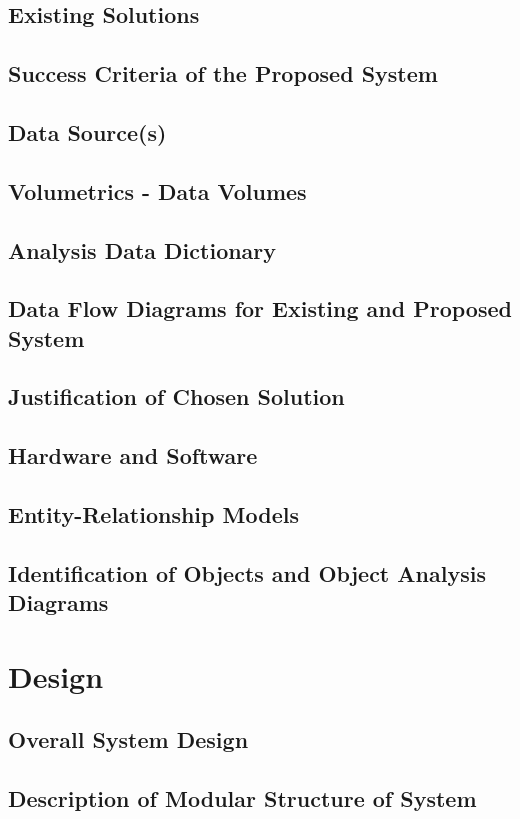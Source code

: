\documentclass[11pt]{article}
\begin{document}
        \subsection{Existing Solutions}
        \subsection{Success Criteria of the Proposed System}
        \subsection{Data Source(s)}
        \subsection{Volumetrics - Data Volumes}
        \subsection{Analysis Data Dictionary}
        \subsection{Data Flow Diagrams for Existing and Proposed System}
        \subsection{Justification of Chosen Solution}
        \subsection{Hardware and Software}
        \subsection{Entity-Relationship Models}
        \subsection{Identification of Objects and Object Analysis Diagrams}

    \section{Design}
        \subsection{Overall System Design}
        \subsection{Description of Modular Structure of System}
\end{document}
